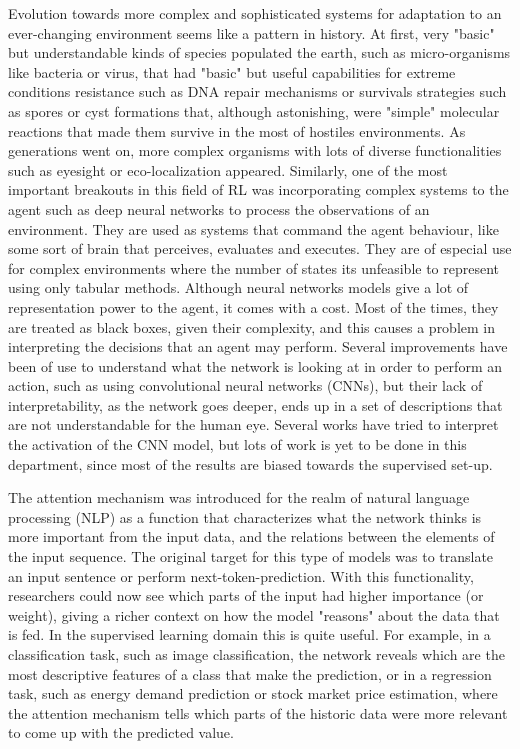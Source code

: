 Evolution towards more complex and sophisticated systems for adaptation to an ever-changing environment seems like a pattern in history. At first, very "basic" but understandable kinds of species populated the earth, such as micro-organisms like bacteria or virus, that had "basic" but useful capabilities for extreme conditions resistance such as DNA repair mechanisms or survivals strategies such as spores or cyst formations that, although astonishing, were "simple" molecular reactions that made them survive in the most of hostiles environments. As generations went on, more complex organisms with lots of diverse functionalities such as eyesight or eco-localization appeared. Similarly, one of the most important breakouts in this field of RL was incorporating complex systems to the agent such as deep neural networks to process the observations of an environment. They are used as systems that command the agent behaviour, like some sort of brain that perceives, evaluates and executes. They are of especial use for complex environments where the number of states its unfeasible to represent using only tabular methods. Although neural networks models give a lot of representation power to the agent, it comes with a cost. Most of the times, they are treated as black boxes, given their complexity, and this causes a problem in interpreting the decisions that an agent may perform. Several improvements have been of use to understand what the network is looking at in order to perform an action, such as using convolutional neural networks (CNNs), but their lack of interpretability, as the network goes deeper, ends up in a set of descriptions that are not understandable for the human eye. Several works have tried to interpret the activation of the CNN model, but lots of work is yet to be done in this department, since most of the results are biased towards the supervised set-up.

 The attention mechanism was introduced for the realm of natural language processing (NLP) as a function that characterizes what the network thinks is more important from the input data, and the relations between the elements of the input sequence. The original target for this type of models was to translate an input sentence or perform next-token-prediction. With this functionality, researchers could now see which parts of the input had higher importance (or weight), giving a richer context on how the model "reasons" about the data that is fed. In the supervised learning domain this is quite useful. For example, in a classification task, such as image classification, the network reveals which are the most descriptive features of a class that make the prediction, or in a regression task, such as energy demand prediction or stock market price estimation, where the attention mechanism tells which parts of the historic data were more relevant to come up with the predicted value. 
 
